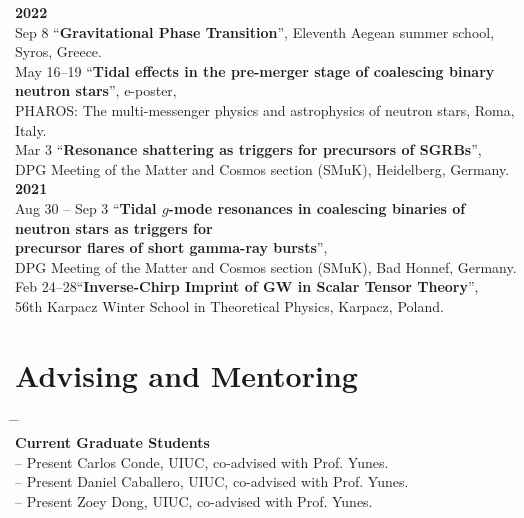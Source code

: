\documentclass[10pt,floatfix,a4paper]{article}
\newcommand{\hk}[1]{\textcolor{UIUCOrange}{#1}}
\begin{document}
\begin{tabbing}
  \> \textbf{2022} \> \\[1ex]
  \> Sep 8 \> ``\textbf{Gravitational Phase Transition}'', Eleventh Aegean summer school, Syros, Greece.\\
  \> May 16--19 \> ``\textbf{Tidal effects in the pre-merger stage of coalescing binary neutron stars}'', e-poster, \\
  \> \> PHAROS: The multi-messenger physics and astrophysics of neutron stars, Roma, Italy.\\
  \> Mar 3 \> ``\textbf{Resonance shattering as triggers for precursors of SGRBs}'', \\
  \> \> DPG Meeting of the Matter and Cosmos section (SMuK), Heidelberg, Germany.\\
  \> \textbf{2021} \> \\[1ex]
  \> Aug 30 -- Sep 3 \> ``\textbf{Tidal $g$-mode resonances in coalescing binaries of neutron stars as triggers for}\\
  \> \> \textbf{precursor flares of short gamma-ray bursts}'', \\ 
  \> \> DPG Meeting of the Matter and Cosmos section (SMuK), Bad Honnef, Germany. \\
  \> Feb 24--28\>``\textbf{Inverse-Chirp Imprint of GW in Scalar Tensor Theory}'', \\ 
  \> \> 56th Karpacz Winter School in Theoretical Physics, Karpacz, Poland.
\end{tabbing}

\section*{Advising and Mentoring}
\begin{tabbing}
  \hspace*{5mm} \= \hspace*{2.3cm} \= \hspace*{10cm} \\[-3ex]
  \> \hk{\textbf{Current Graduate Students}} \>  \\
   -- Present \> Carlos Conde, UIUC, co-advised with Prof. Yunes. \\
   -- Present \> Daniel Caballero, UIUC, co-advised with Prof. Yunes. \\
   -- Present \> Zoey Dong, UIUC, co-advised with Prof. Yunes. \\
\end{tabbing}

\end{document}
